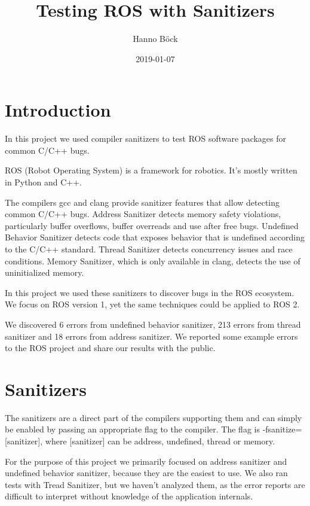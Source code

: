 \documentclass{article}
\begin{document}
\title{Testing ROS with Sanitizers}
\author{Hanno Böck}
\date{2019-01-07}
\maketitle

\tableofcontents

\section{Introduction}

In this project we used compiler sanitizers to test ROS software packages for common C/C++ bugs.

ROS (Robot Operating System) is a framework for robotics. It's mostly written in Python and C++.

The compilers gcc and clang provide sanitizer features that allow detecting common C/C++ bugs.
Address Sanitizer \cite{asan} detects memory safety violations, particularly buffer overflows, buffer overreads
and use after free bugs. Undefined Behavior Sanitizer detects code that exposes behavior that is
undefined according to the C/C++ standard. Thread Sanitizer detects concurrency issues and race
conditions. Memory Sanitizer, which is only available in clang, detects the use of uninitialized
memory.

In this project we used these sanitizers to discover bugs in the ROS ecosystem. We focus on ROS
version 1, yet the same techniques could be applied to ROS 2.

We discovered 6 errors from undefined behavior sanitizer,
213 errors from thread sanitizer and 18 errors from address sanitizer. We reported some
example errors to the ROS project and share our results with the public.

\section{Sanitizers}

The sanitizers are a direct part of the compilers supporting them and can simply be enabled
by passing an appropriate flag to the compiler. The flag is -fsanitize=[sanitizer], where [sanitizer]
can be address, undefined, thread or memory.

For the purpose of this project we primarily focused on address sanitizer and undefined behavior sanitizer,
because they are the easiest to use. We also ran tests with Tread Sanitizer, but we haven't analyzed them,
as the error reports are difficult to interpret without knowledge of the application internals.
\end{document}
